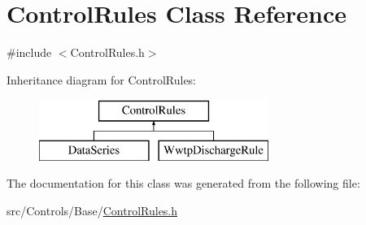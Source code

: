 \hypertarget{classControlRules}{}\section{Control\+Rules Class Reference}
\label{classControlRules}


{\ttfamily \#include $<$Control\+Rules.\+h$>$}

Inheritance diagram for Control\+Rules\+:\begin{figure}[H]
\begin{center}
\leavevmode
\includegraphics[height=2.000000cm]{classControlRules}
\end{center}
\end{figure}


The documentation for this class was generated from the following file\+:\begin{DoxyCompactItemize}
\item 
src/\+Controls/\+Base/\mbox{\hyperlink{ControlRules_8h}{Control\+Rules.\+h}}\end{DoxyCompactItemize}
